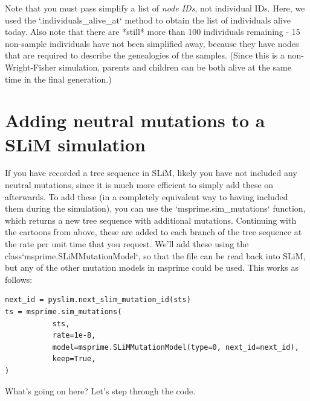 \documentclass[12pt]{article}
\begin{document}
Note that you must pass simplify a list of \textit{node IDs}, not individual IDs.
Here, we used the `.individuals\_alive\_at` method to obtain the list
of individuals alive today.
Also note that there are *still* more than 100 individuals remaining - 15 non-sample individuals
have not been simplified away,
because they have nodes that are required to describe the genealogies of the samples.
(Since this is a non-Wright-Fisher simulation,
parents and children can be both alive at the same time in the final generation.)



\section{Adding neutral mutations to a SLiM simulation}


If you have recorded a tree sequence in SLiM, likely you have not included any neutral mutations,
since it is much more efficient to simply add these on afterwards.
To add these (in a completely equivalent way to having included them during the simulation),
you can use the `msprime.sim\_mutations` function, which returns a new tree sequence with additional mutations.
Continuing with the cartoons from above, these are added to each branch of the tree sequence
at the rate per unit time that you request.
We'll add these using the {class}`msprime.SLiMMutationModel`, so that the file can be read back into SLiM,
but any of the other mutation models in msprime could be used.
This works as follows:
\begin{verbatim}
next_id = pyslim.next_slim_mutation_id(sts)
ts = msprime.sim_mutations(
           sts,
           rate=1e-8,
           model=msprime.SLiMMutationModel(type=0, next_id=next_id),
           keep=True,
)
\end{verbatim}


What's going on here? Let's step through the code.
\end{document}
